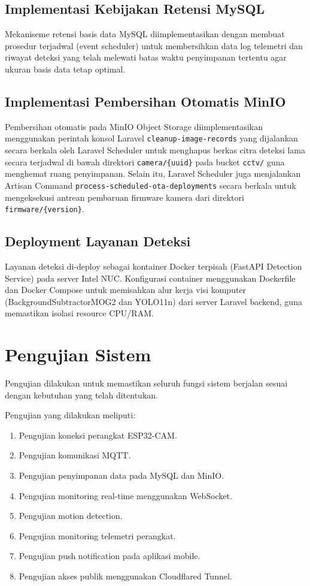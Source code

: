 \subsection{Implementasi Kebijakan Retensi MySQL}

Mekaniseme retensi basis data MySQL diimplementasikan dengan membuat prosedur terjadwal (event scheduler) untuk membersihkan data log telemetri dan riwayat deteksi yang telah melewati batas waktu penyimpanan tertentu agar ukuran basis data tetap optimal.

\subsection{Implementasi Pembersihan Otomatis MinIO}

Pembersihan otomatis pada MinIO Object Storage diimplementasikan menggunakan perintah konsol Laravel \texttt{cleanup-image-records} yang dijalankan secara berkala oleh Laravel Scheduler untuk menghapus berkas citra deteksi lama secara terjadwal di bawah direktori \texttt{camera/\{uuid\}} pada bucket \texttt{cctv/} guna menghemat ruang penyimpanan. Selain itu, Laravel Scheduler juga menjalankan Artisan Command \texttt{process-scheduled-ota-deployments} secara berkala untuk mengeksekusi antrean pembaruan firmware kamera dari direktori \texttt{firmware/\{version\}}.

\subsection{Deployment Layanan Deteksi}

Layanan deteksi di-deploy sebagai kontainer Docker terpisah (FastAPI Detection Service) pada server Intel NUC. Konfigurasi container menggunakan Dockerfile dan Docker Compose untuk memisahkan alur kerja visi komputer (BackgroundSubtractorMOG2 dan YOLO11n) dari server Laravel backend, guna memastikan isolasi resource CPU/RAM.

\section{Pengujian Sistem}

Pengujian dilakukan untuk memastikan seluruh fungsi sistem berjalan sesuai dengan kebutuhan yang telah ditentukan.

Pengujian yang dilakukan meliputi:

\begin{enumerate}
	\item Pengujian koneksi perangkat ESP32-CAM.
	\item Pengujian komunikasi MQTT.
	\item Pengujian penyimpanan data pada MySQL dan MinIO.
	\item Pengujian monitoring real-time menggunakan WebSocket.
	\item Pengujian motion detection.
	\item Pengujian monitoring telemetri perangkat.
	\item Pengujian push notification pada aplikasi mobile.
	\item Pengujian akses publik menggunakan Cloudflared Tunnel.
\end{enumerate}